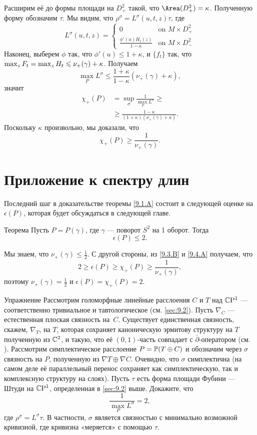 Расширим её до формы площади на $D_+^2$ такой, что $\Area (D_+^2) = \kappa$.
Полученную форму обозначим $\tau$.
Мы видим, что $\rho^\sigma = L^\sigma (u, t, z)\tau$, где 
\[
L^\sigma(u,t,z)=
\begin{cases}
0&\text{on\ } M\times D^2_+
\\
\frac{\phi'(u)H_t(z)}{1-\kappa}&\text{on\ } M\times D^2_-
\end{cases}
\]
Наконец, выберем $\phi$ так, что $\phi' (u) \le 1 + \kappa$, и
$\{f_t\}$ так, что $\max_z F_t \z= \max_z H_t \le \nu_+ (\gamma) +
\kappa$. 
Получаем
\[\max_P L^\sigma \le  \frac{1+\kappa}{1-\kappa} (\nu_+ (\gamma) + \kappa),\]
значит 
\begin{align*}
\chi_+ (P) &= \sup_\sigma \frac1{\max_PL^\sigma}\ge
\\
&\ge\frac{1-\kappa}{(1 + \kappa)(\nu_+ (\gamma) + \kappa)}. 
\end{align*}
Поскольку $\kappa$ произвольно, мы доказали, что 
\[\chi_+ (P) \ge \frac{1}{\nu_+ (\gamma)}.\]
\qeds{}

\section{Приложение к спектру длин}\label{sec:9.4}

Последний шаг в доказательстве теоремы \ref{9.1.A} состоит в следующей оценке на $\epsilon(P)$, которая будет обсуждаться в следующей главе.

\begin{thm}{Теорема}\label{9.4.A}
Пусть $P = P(\gamma)$, где $\gamma$ --- поворот $S^2$ на 1 оборот.
Тогда
\[\epsilon(P) \le 2.\]
\end{thm}

Мы знаем, что $\nu_+ (\gamma) \le \tfrac12$.
С другой стороны, из \ref{9.3.B} и \ref{9.4.A} получаем, что
\[2 \ge \epsilon(P) \ge \chi_+ (P) \ge\frac1{\nu_+(\gamma)},\]
поэтому $\nu_+ (\gamma) = \tfrac12$ и $\epsilon(P) = \chi_+ (P) = 2$.
\qeds

\begin{ex}{Упражнение}
Рассмотрим голоморфные линейные расслоения $C$ и $T$ над $\mathbb{C}\mathrm{P}^1$ --- соответственно тривиальное и тавтологическое (см. \ref{sec:9.2}).
Пусть $\nabla_C$ --- естественная плоская связность на~$C$.
Существует единственная связность, скажем, $\nabla_T$, на $T$, которая сохраняет каноническую эрмитову структуру  на $T$ полученную из $\mathbb{C}^2$, и такую, что её $(0,1)$-часть совпадает с $\bar\partial$-оператором (см. \cite{GH}).
Рассмотрим симплектическое расслоение $P = \mathbb{P}(T \oplus C)$ и обозначим через $\sigma$ связность на $P$, полученную из $\nabla T \oplus \nabla C$.
Очевидно, что $\sigma$ симплектична (на самом деле её параллельный перенос сохраняет как симплектическую, так и комплексную структуру на слоях).
Пусть $\tau$ есть форма площади Фубини --- Штуди на $\mathbb{C}\mathrm{P}^1$, определенная в \ref{sec:9.2} выше.
Докажите, что 
\[\frac1{\max_P L^\sigma}=2,\]
где $\rho^\sigma = L^\sigma \tau$.
В частности, $\sigma$ является связностью с минимально возможной кривизной, где кривизна «меряется» с  помощью $\tau$. 
\end{ex}
